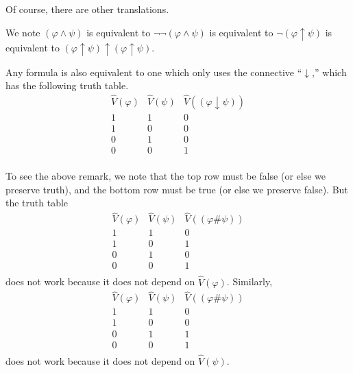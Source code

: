 \documentclass[../notes.tex]{subfiles}
\begin{document}
Of course, there are other translations.
\begin{example}
	We note $(\varphi\land\psi)$ is equivalent to $\lnot\lnot(\varphi\land\psi)$ is equivalent to $\lnot(\varphi\uparrow\psi)$ is equivalent to $(\varphi\uparrow\psi)\uparrow(\varphi\uparrow\psi)$.
\end{example}
\begin{remark}
	Any formula is also equivalent to one which only uses the connective ``$\downarrow$,'' which has the following truth table.
	\[\begin{array}{c|c||c}
		\hat V(\varphi) & \hat V(\psi) & \hat V((\varphi\downarrow\psi)) \\
		\hline
		1 & 1 & 0 \\
		1 & 0 & 0 \\
		0 & 1 & 0 \\
		0 & 0 & 1 \\
	\end{array}\]
\end{remark}
To see the above remark, we note that the top row must be false (or else we preserve truth), and the bottom row must be true (or else we preserve false). But the truth table
\[\begin{array}{c|c||c}
	\hat V(\varphi) & \hat V(\psi) & \hat V((\varphi\#\psi)) \\
	\hline
	1 & 1 & 0 \\
	1 & 0 & 1 \\
	0 & 1 & 0 \\
	0 & 0 & 1 \\
\end{array}\]
does not work because it does not depend on $\hat V(\varphi)$. Similarly,
\[\begin{array}{c|c||c}
	\hat V(\varphi) & \hat V(\psi) & \hat V((\varphi\#\psi)) \\
	\hline
	1 & 1 & 0 \\
	1 & 0 & 0 \\
	0 & 1 & 1 \\
	0 & 0 & 1 \\
\end{array}\]
does not work because it does not depend on $\hat V(\psi)$.
\end{document}
